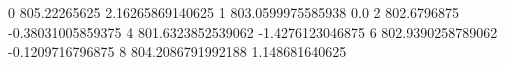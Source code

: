 0 805.22265625 2.16265869140625
1 803.0599975585938 0.0
2 802.6796875 -0.38031005859375
4 801.6323852539062 -1.4276123046875
6 802.9390258789062 -0.1209716796875
8 804.2086791992188 1.148681640625
